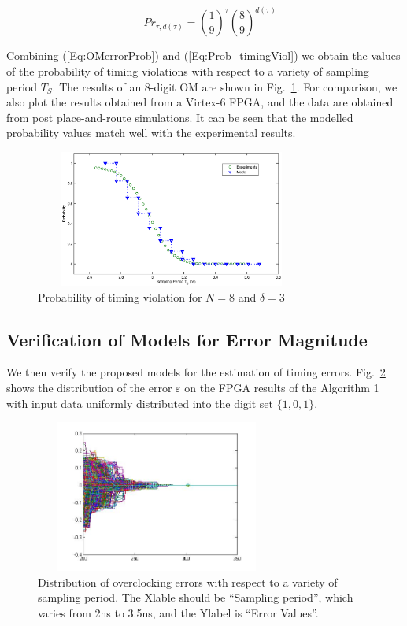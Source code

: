 \documentclass[journal]{IEEEtran}
\begin{document}
\begin{equation}\label{Eq:OMerrorProb}
 \quad Pr_{\tau,d(\tau )} =\left(\frac{1}{9}\right)^\tau \left(\frac{8}{9}\right)^{d(\tau )} 
\end{equation}

Combining (\ref{Eq:OMerrorProb}) and (\ref{Eq:Prob_timingViol}) we obtain the values of the probability of timing violations with respect to a variety of sampling period $T_S$. The results of an 8-digit OM are shown in Fig.~\ref{Fig:ProbTimingViol}. For comparison, we also plot the results obtained from a Virtex-6 FPGA, and the data are obtained from post place-and-route simulations. It can be seen that the modelled probability values match well with the experimental results.


\begin{figure}[tbp]
\begin{center}
\includegraphics[width=9cm,height=4.5cm]{./Figures/probTimingViolationFPGA.eps}
\caption{ Probability of timing violation for $N=8$ and $\delta=3$ }
\label{Fig:ProbTimingViol}
\end{center}
\end{figure}

\subsection{Verification of Models for Error Magnitude}
We then verify the proposed models for the estimation of timing errors. Fig.~\ref{FigerrorC} shows the distribution of the error $\varepsilon$ on the FPGA results of the Algorithm 1 with input data uniformly distributed into the digit set $\{\overline{1},0,1\}$. \\

\begin{figure}[tbp]
	\centering
	\includegraphics[width=8cm,height=5cm]{./Figures/FigerrorC}
\caption{Distribution of overclocking errors with respect to a variety of sampling period. The Xlable should be ``Sampling period'', which varies from 2ns to 3.5ns, and the Ylabel is ``Error Values''. }
	\label{FigerrorC}
	
\end{figure}
\end{document}
